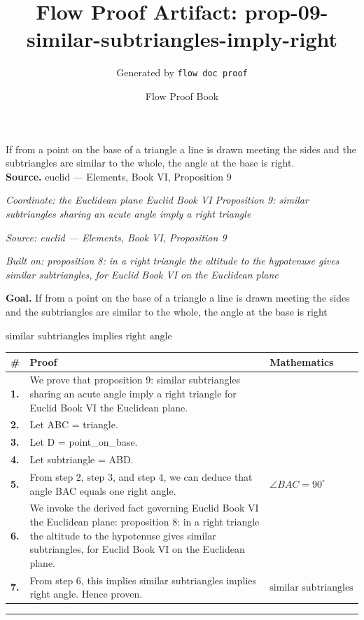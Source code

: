 \documentclass[11pt]{article}
\title{Flow Proof Artifact: prop-09-similar-subtriangles-imply-right}
\author{Generated by \texttt{flow doc proof}}
\date{Flow Proof Book}
\theoremstyle{definition}
\begin{document}
\maketitle
If from a point on the base of a triangle a line is drawn meeting the sides and the subtriangles are similar to the whole, the angle at the base is right.\\[0.5em]
\textbf{Source.} euclid — Elements, Book VI, Proposition 9\\[0.5em]
\bigskip
{}\par
\smallskip\noindent\textit{Coordinate: the Euclidean plane \cdot Euclid Book VI \cdot Proposition 9: similar subtriangles sharing an acute angle imply a right triangle}\par
\smallskip\noindent\textit{Source: euclid — Elements, Book VI, Proposition 9}\par
\smallskip\noindent\textit{Built on: proposition 8: in a right triangle the altitude to the hypotenuse gives similar subtriangles, for Euclid Book VI on the Euclidean plane}\par
\medskip
\noindent\textbf{Goal.} If from a point on the base of a triangle a line is drawn meeting the sides and the subtriangles are similar to the whole, the angle at the base is right\par
\noindent$\displaystyle \text{similar subtriangles implies right angle}$\par
\medskip
\noindent
\begin{tabular}{@{} >{\raggedright\arraybackslash}p{} >{\raggedright\arraybackslash}p{} >{\raggedleft\arraybackslash}p{} @{}}
\textbf{\#} & \textbf{Proof} & \textbf{Mathematics} \\
\midrule
\textbf{1.} & We prove that proposition 9: similar subtriangles sharing an acute angle imply a right triangle for Euclid Book VI the Euclidean plane. & \\[0.45em]
\textbf{2.} & Let ABC = triangle. & \\[0.45em]
\textbf{3.} & Let D = point\_on\_base. & \\[0.45em]
\textbf{4.} & Let subtriangle = ABD. & \\[0.45em]
\textbf{5.} & From step 2, step 3, and step 4, we can deduce that angle BAC equals one right angle. & $\displaystyle \angle BAC = 90^\circ$ \\[0.45em]
\textbf{6.} & We invoke the derived fact governing Euclid Book VI the Euclidean plane: proposition 8: in a right triangle the altitude to the hypotenuse gives similar subtriangles, for Euclid Book VI on the Euclidean plane. & \\[0.45em]
\textbf{7.} & From step 6, this implies similar subtriangles implies right angle. Hence proven. & $\displaystyle \text{similar subtriangles implies right angle}$ \\[0.45em]
\bottomrule
\end{tabular}
\label{thm:Geometry-Euclid Book VI-proposition_9_similar_subtriangles_sharing_an_acute_angle_imply_a_right_triangle}
\par\medskip\hrule
\end{document}
